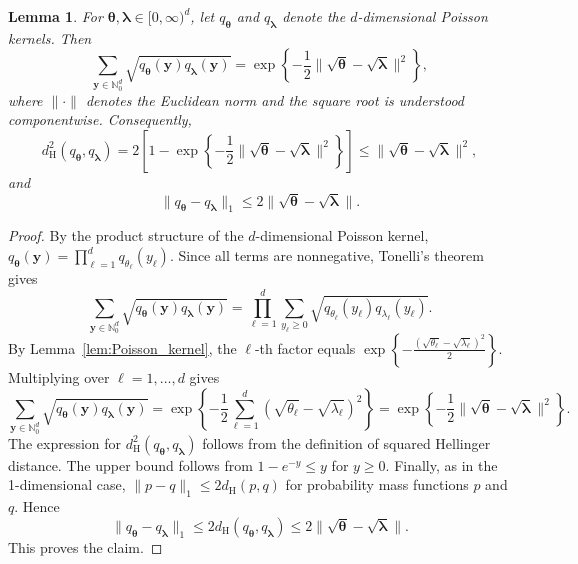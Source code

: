 \documentclass[twoside,12pt]{article}
\newtheorem{lem}[thm]{Lemma}
\begin{document}
\begin{lem}\label{lem:Poisson_kernel_d}
For $\boldsymbol\theta,\boldsymbol\lambda\in[0,\infty)^d$, let $q_{\boldsymbol\theta}$ and $q_{\boldsymbol\lambda}$ denote the $d$-dimensional Poisson kernels.
Then
\begin{displaymath}
\sum_{\boldsymbol y\in\mathbb N_0^d}\sqrt{q_{\boldsymbol\theta}(\boldsymbol y)q_{\boldsymbol\lambda}(\boldsymbol y)}=\exp\!\left\{-\frac{1}{2}\|\sqrt{\boldsymbol\theta}-\sqrt{\boldsymbol\lambda}\|^2\right\},
\end{displaymath}
where $\|\cdot\|$ denotes the Euclidean norm and the square root is understood componentwise. Consequently,
\begin{displaymath}
d_{\mathrm H}^2(q_{\boldsymbol\theta},q_{\boldsymbol\lambda})=2\left[1-\exp\!\left\{-\frac{1}{2}\|\sqrt{\boldsymbol\theta}-\sqrt{\boldsymbol\lambda}\|^2\right\}\right]\le\|\sqrt{\boldsymbol\theta}-\sqrt{\boldsymbol\lambda}\|^2,
\end{displaymath}
and
\begin{displaymath}
\|q_{\boldsymbol\theta}-q_{\boldsymbol\lambda}\|_1\le 2\|\sqrt{\boldsymbol\theta}-\sqrt{\boldsymbol\lambda}\|.
\end{displaymath}
\end{lem}

\begin{proof}
By the product structure of the $d$-dimensional Poisson kernel, $q_{\boldsymbol\theta}(\boldsymbol y)=\prod_{\ell=1}^d q_{\theta_\ell}(y_\ell)$. Since all terms are nonnegative, Tonelli's theorem gives
\begin{displaymath}
\sum_{\boldsymbol y\in\mathbb N_0^d}\sqrt{q_{\boldsymbol\theta}(\boldsymbol y)q_{\boldsymbol\lambda}(\boldsymbol y)}=\prod_{\ell=1}^d\sum_{y_\ell\ge 0}\sqrt{q_{\theta_\ell}(y_\ell)q_{\lambda_\ell}(y_\ell)}.
\end{displaymath}
By Lemma~\ref{lem:Poisson_kernel}, the $\ell$-th factor equals $\exp\!\left\{-\frac{(\sqrt{\theta_\ell}-\sqrt{\lambda_\ell})^2}{2}\right\}$. Multiplying over $\ell=1,\ldots,d$ gives
\begin{displaymath}
\sum_{\boldsymbol y\in\mathbb N_0^d}\sqrt{q_{\boldsymbol\theta}(\boldsymbol y)q_{\boldsymbol\lambda}(\boldsymbol y)}=\exp\!\left\{-\frac{1}{2}\sum_{\ell=1}^d
(\sqrt{\theta_\ell}-\sqrt{\lambda_\ell})^2\right\}=\exp\!\left\{-\frac{1}{2}\|\sqrt{\boldsymbol\theta}-\sqrt{\boldsymbol\lambda}\|^2\right\}.
\end{displaymath}
The expression for $d_{\mathrm H}^2(q_{\boldsymbol\theta},q_{\boldsymbol\lambda})$ follows from the definition of squared Hellinger distance. The upper bound follows from $1-e^{-y}\le y$ for $y\ge0$. Finally, as in the 1-dimensional case, $\|p-q\|_1\le 2d_{\mathrm H}(p,q)$ for probability mass functions $p$ and $q$. Hence
\begin{displaymath}
\|q_{\boldsymbol\theta}-q_{\boldsymbol\lambda}\|_1\le2d_{\mathrm H}(q_{\boldsymbol\theta},q_{\boldsymbol\lambda})\le2\|\sqrt{\boldsymbol\theta}-\sqrt{\boldsymbol\lambda}\|.
\end{displaymath}
This proves the claim.
\end{proof}
\end{document}
